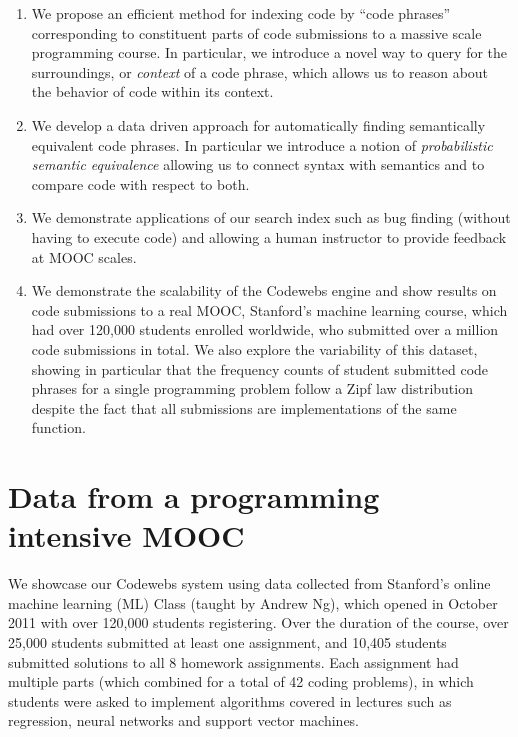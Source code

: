 \begin{enumerate}
\item We propose an efficient method for indexing code by ``code phrases'' corresponding to constituent parts
of code submissions to a massive scale programming course.  In particular, we introduce a novel way to query for the surroundings, or \emph{context} of a code phrase, 
which allows us to reason about the behavior of code within its context.
\item We develop a data driven approach for automatically finding semantically equivalent code phrases.
In particular we introduce a notion of \emph{probabilistic semantic equivalence} allowing
us to connect syntax with semantics and to compare code with respect to both.
\item We demonstrate applications of our search index
such as bug finding (without having to execute code) and 
allowing a human instructor to  provide feedback at MOOC scales.
\item We demonstrate the scalability of the Codewebs engine and show results on code submissions to a real MOOC, Stanford's machine learning course,
which  had over 120,000 students enrolled worldwide, who submitted over a million code submissions in total.
We also explore the variability of this dataset, showing in particular that the frequency counts of  
student submitted code phrases for a single programming problem follow a Zipf law distribution despite the
fact that all submissions are implementations of the same function.
\end{enumerate}






\section{Data from a programming intensive MOOC}\label{sec:dataset}
We showcase our Codewebs system using data collected from 
Stanford's online machine learning (ML) Class (taught by Andrew Ng), 
which opened in October 2011 with over 
120,000 students registering. Over the duration of the course,
over 25,000 students submitted at least one assignment, and 
10,405 students submitted solutions to all 8 homework assignments.  Each
assignment had multiple parts (which combined for a total of 42 
coding problems), in which students were asked to implement algorithms covered in lectures such as regression, neural networks and support vector machines.

